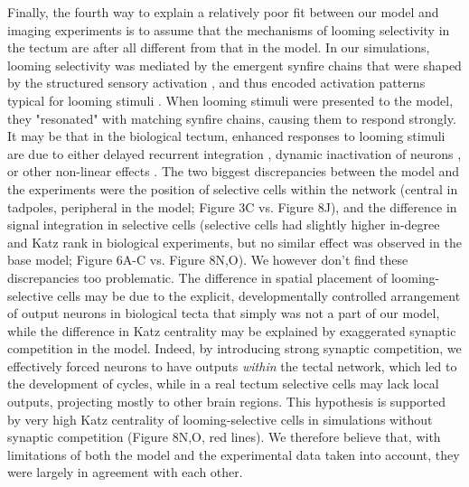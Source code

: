 \documentclass{article}
\begin{document}
Finally, the fourth way to explain a relatively poor fit between our model and imaging experiments is to assume that the mechanisms of looming selectivity in the tectum are after all different from that in the model. In our simulations, looming selectivity was mediated by the emergent synfire chains \citep{cohen2002synreview, zheng2014synfire} that were shaped by the structured sensory activation \citep{vislay2006rf, clopath2010stdpcoding}, and thus encoded activation patterns typical for looming stimuli \citep{pratt2008recurrent, richards2010stdp}. When looming stimuli were presented to the model, they "resonated" with matching synfire chains, causing them to respond strongly. It may be that in the biological tectum, enhanced responses to looming stimuli are due to either delayed recurrent integration \citep{khakhalin2014, jang2016}, dynamic inactivation of neurons \citep{fotowat2011multiplexing}, or other non-linear effects \citep{baginskas2009recurrent, heap2018dimming}. The two biggest discrepancies between the model and the experiments were the position of selective cells within the network (central in tadpoles, peripheral in the model; Figure 3C vs. Figure 8J), and the difference in signal integration in selective cells (selective cells had slightly higher in-degree and Katz rank in biological experiments, but no similar effect was observed in the base model; Figure 6A-C vs. Figure 8N,O). We however don't find these discrepancies too problematic. The difference in spatial placement of looming-selective cells may be due to the explicit, developmentally controlled arrangement of output neurons in biological tecta that simply was not a part of our model, while the difference in Katz centrality may be explained by exaggerated synaptic competition in the model. Indeed, by introducing strong synaptic competition, we effectively forced neurons to have outputs \textit{within} the tectal network, which led to the development of cycles, while in a real tectum selective cells may lack local outputs, projecting mostly to other brain regions. This hypothesis is supported by very high Katz centrality of looming-selective cells in simulations without synaptic competition (Figure 8N,O, red lines). We therefore believe that, with limitations of both the model and the experimental data taken into account, they were largely in agreement with each other. 
\end{document}
